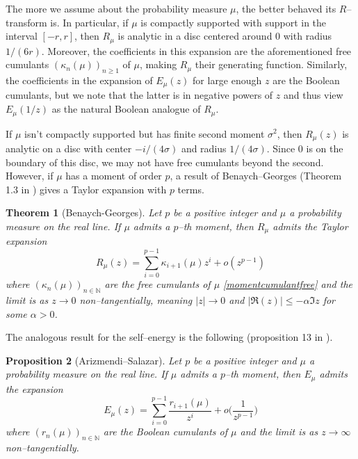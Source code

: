 \documentclass{amsart}
\newtheorem{theorem}{Theorem}[section]
\newtheorem{proposition}[theorem]{Proposition}
\theoremstyle{definition}
\theoremstyle{remark}
\numberwithin{equation}{section}
\begin{document}
The more we assume about the probability measure $\mu$, the better behaved its $R$--transform is. In particular, if $\mu$ is compactly supported with support in the interval $[-r,r]$, then $R_\mu$ is analytic in a disc centered around $0$ with radius $1/(6r)$. Moreover, the coefficients in this expansion are the aforementioned free cumulants  $(\kappa_n(\mu))_{n\geq 1}$ of $\mu$, making $R_\mu$ their generating function. Similarly, the coefficients in the expansion of $E_\mu(z)$ for large enough $z$ are the Boolean cumulants, but we note that the latter is in negative powers of $z$ and thus view $E_\mu(1/z)$ as the natural Boolean analogue of $R_\mu$. 

 If $\mu$ isn't compactly supported but has finite second moment $\sigma^2$, then $R_\mu(z)$ is analytic on a disc with center $-i/(4\sigma)$ and radius $1/(4\sigma)$. Since $0$ is on the boundary of this disc, we may not have free cumulants beyond the second. However, if $\mu$ has a moment of order $p$, a result of Benaych--Georges (Theorem 1.3 in \cite{BenaychGeorges}) gives a Taylor expansion with $p$ terms. 
 \begin{theorem}[Benaych-Georges]\label{BGtheorem} Let $p$ be a positive integer and $\mu$ a probability measure on the real line. If $\mu$ admits a $p$--th moment, then $R_\mu$ admits the Taylor expansion
 \[
    R_\mu(z)=\sum_{i=0}^{p-1}\kappa_{i+1}(\mu)z^i+o(z^{p-1})
 \]
 where $(\kappa_n(\mu))_{n\in\mathbb{N}}$ are the free cumulants of $\mu$ \eqref{momentcumulantfree} and the limit is as $z\to 0$ non--tangentially, meaning $|z|\to 0$ and $|\Re(z)|\leq -\alpha \Im{z}$ for some $\alpha>0$.
 \end{theorem}

The analogous result for the self--energy is the following (proposition 13 in \cite{SalazarThesis}).
\begin{proposition}[Arizmendi--Salazar]\label{Kexpansion} Let $p$ be a positive integer and $\mu$ a probability measure on the real line. If $\mu$ admits a $p$--th moment, then $E_\mu$ admits the expansion
\[
    E_\mu(z)=\sum_{i=0}^{p-1}\frac{r_{i+1}(\mu)}{z^i}+o\bigg(\frac{1}{z^{p-1}}\bigg) 
\]
where $(r_n(\mu))_{n\in\mathbb{N}}$ are the Boolean cumulants of $\mu$ and the limit is as $z\to \infty$ non--tangentially.
\end{proposition}
\end{document}
